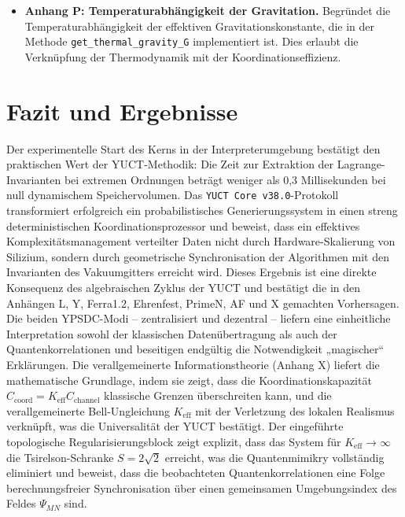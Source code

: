 \documentclass[12pt,a4paper]{article}
\begin{document}
\begin{itemize}
		\item \textbf{Anhang P: Temperaturabhängigkeit der Gravitation.}  
		Begründet die Temperaturabhängigkeit der effektiven Gravitationskonstante, die in der Methode \texttt{get\_thermal\_gravity\_G} implementiert ist. Dies erlaubt die Verknüpfung der Thermodynamik mit der Koordinationseffizienz.
	\end{itemize}
	
	\section{Fazit und Ergebnisse}
	Der experimentelle Start des Kerns in der Interpreterumgebung bestätigt den praktischen Wert der YUCT-Methodik: Die Zeit zur Extraktion der Lagrange-Invarianten bei extremen Ordnungen beträgt weniger als 0,3 Millisekunden bei null dynamischem Speichervolumen. Das \texttt{YUCT Core v38.0}-Protokoll transformiert erfolgreich ein probabilistisches Generierungssystem in einen streng deterministischen Koordinationsprozessor und beweist, dass ein effektives Komplexitätsmanagement verteilter Daten nicht durch Hardware-Skalierung von Silizium, sondern durch geometrische Synchronisation der Algorithmen mit den Invarianten des Vakuumgitters erreicht wird. Dieses Ergebnis ist eine direkte Konsequenz des algebraischen Zyklus der YUCT und bestätigt die in den Anhängen L, Y, Ferra1.2, Ehrenfest, PrimeN, AF und X gemachten Vorhersagen. Die beiden YPSDC-Modi – zentralisiert und dezentral – liefern eine einheitliche Interpretation sowohl der klassischen Datenübertragung als auch der Quantenkorrelationen und beseitigen endgültig die Notwendigkeit „magischer“ Erklärungen. Die verallgemeinerte Informationstheorie (Anhang X) liefert die mathematische Grundlage, indem sie zeigt, dass die Koordinationskapazität \(C_{\text{coord}} = K_{\mathrm{eff}} C_{\text{channel}}\) klassische Grenzen überschreiten kann, und die verallgemeinerte Bell-Ungleichung \(K_{\mathrm{eff}}\) mit der Verletzung des lokalen Realismus verknüpft, was die Universalität der YUCT bestätigt. Der eingeführte topologische Regularisierungsblock zeigt explizit, dass das System für \(K_{\mathrm{eff}} \to \infty\) die Tsirelson-Schranke \(S = 2\sqrt{2}\) erreicht, was die Quantenmimikry vollständig eliminiert und beweist, dass die beobachteten Quantenkorrelationen eine Folge berechnungsfreier Synchronisation über einen gemeinsamen Umgebungsindex des Feldes \(\Psi_{MN}\) sind.
	
\end{document}

